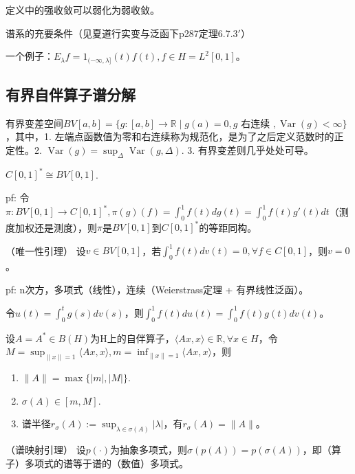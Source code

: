 定义中的强收敛可以弱化为弱收敛。

谱系的充要条件（见夏道行实变与泛函下p287定理6.7.3$'$）

一个例子：$E_{\lambda} f=1_{(-\infty, \lambda]}(t) f(t), f \in H = L^{2}[0,1]$。

\subsection{有界自伴算子谱分解}

有界变差空间$BV[a, b] = \{g: [a, b] \to \mathbb{R} \mid g(a) = 0, g \text{ 右连续 }, \operatorname{Var}(g) < \infty\}$，其中，1. 左端点函数值为零和右连续称为规范化，是为了之后定义范数时的正定性。2. $\operatorname{Var}(g) = \sup_{\Delta} \operatorname{Var}(g, \Delta)$. 3. 有界变差则几乎处处可导。

\begin{lem}
  $C[0, 1]^{\ast} \cong BV[0, 1]$.
\end{lem}

pf: 令$\pi: BV[0, 1] \to C[0, 1]^{\ast}, \pi(g)(f) = \int_0^1 f(t) dg(t) = \int_0^1 f(t) g'(t) dt$（测度加权还是测度），则$\pi$是$BV[0, 1]$到$C[0, 1]^{\ast}$的等距同构。

\begin{lem}（唯一性引理）
  设$v \in BV[0, 1]$，若$\int_0^1 f(t) dv(t) = 0, \forall f \in C[0, 1]$，则$v = 0$。
\end{lem}

pf: n次方，多项式（线性），连续（Weierstrass定理 + 有界线性泛函）。

\begin{lem}
  令$u(t) = \int_0^t g(s) dv(s)$，则$\int_0^1 f(t) du(t) = \int_0^1 f(t) g(t) dv(t)$。
\end{lem}

\begin{lem}
  设$A = A^{\ast} \in B(H)$为H上的自伴算子，$\langle Ax, x \rangle \in \mathbb{R}, \forall x \in H$，令$M = \sup_{\|x\| = 1}\langle Ax, x \rangle, m = \inf_{\|x\| = 1}\langle Ax, x \rangle$，则
  \begin{enumerate}
    \item $\|A\| = \max\{|m|, |M|\}$.
    \item $\sigma(A) \in [m, M]$.
    \item 谱半径$r_\sigma(A) := \sup_{\lambda \in \sigma(A)} |\lambda|$，有$r_\sigma(A) = \|A\|$。
  \end{enumerate}
\end{lem}

\begin{lem}（谱映射引理）
  设$p(\cdot)$为抽象多项式，则$\sigma(p(A)) = p(\sigma(A))$，即（算子）多项式的谱等于谱的（数值）多项式。
\end{lem}

